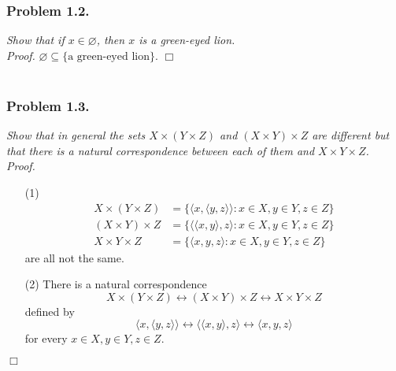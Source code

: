 \documentclass{article}
\begin{document}
\subsubsection*{Problem 1.2.}
\emph{Show that if $x \in \varnothing$, then $x$ is a green-eyed lion.} \\

\emph{Proof.}
$\varnothing \subseteq \{ \text{a green-eyed lion} \}$.
$\Box$ \\\\






\subsubsection*{Problem 1.3.}
\emph{Show that in general the sets $X \times (Y \times Z)$ and
$(X \times Y) \times Z$ are different but
that there is a natural correspondence between each of them and $X \times Y \times Z$.} \\



\emph{Proof.}
\begin{enumerate}
\item[(1)]
  \begin{align*}
    X \times (Y \times Z)
    &= \{ \langle x, \langle y, z \rangle \rangle : x \in X, y \in Y, z \in Z \} \\
    (X \times Y) \times Z
    &= \{ \langle \langle x, y \rangle, z \rangle : x \in X, y \in Y, z \in Z \} \\
    X \times Y \times Z
    &= \{ \langle x, y, z \rangle : x \in X, y \in Y, z \in Z \}
  \end{align*}
  are all not the same.

\item[(2)]
  There is a natural correspondence
  \[
    X \times (Y \times Z)
    \longleftrightarrow (X \times Y) \times Z
    \longleftrightarrow X \times Y \times Z
  \]
  defined by
  \[
    \langle x, \langle y, z \rangle \rangle
    \longleftrightarrow \langle \langle x, y \rangle, z \rangle
    \longleftrightarrow \langle x, y, z \rangle
  \]
  for every $x \in X, y \in Y, z \in Z$.
\end{enumerate}
$\Box$ \\\\
\end{document}

